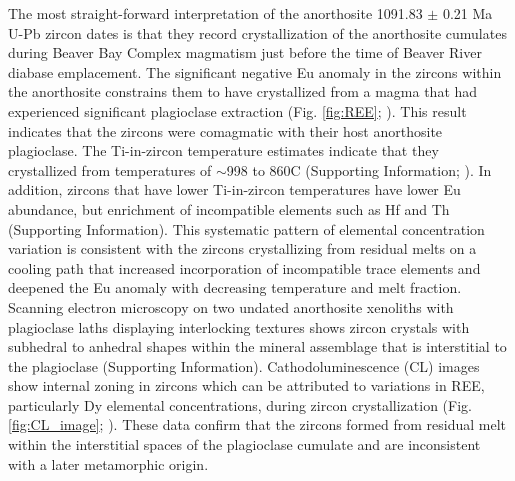 The most straight-forward interpretation of the anorthosite 1091.83 $\pm$ 0.21 Ma U-Pb zircon dates is that they record crystallization of the anorthosite cumulates during Beaver Bay Complex magmatism just before the time of Beaver River diabase emplacement. The significant negative Eu anomaly in the zircons within the anorthosite constrains them to have crystallized from a magma that had experienced significant plagioclase extraction (Fig. \ref{fig:REE}; \cite{Rubatto2002a, Schaltegger1999a}). This result indicates that the zircons were comagmatic with their host anorthosite plagioclase. The Ti-in-zircon temperature estimates indicate that they crystallized from temperatures of $\sim$998 to 860\textdegree C (Supporting Information; \cite{Ferry2007a}). In addition, zircons that have lower Ti-in-zircon temperatures have lower Eu abundance, but enrichment of incompatible elements such as Hf and Th (Supporting Information). This systematic pattern of elemental concentration variation is consistent with the zircons crystallizing from residual melts on a cooling path that increased incorporation of incompatible trace elements and deepened the Eu anomaly with decreasing temperature and melt fraction. Scanning electron microscopy on two undated anorthosite xenoliths with plagioclase laths displaying interlocking textures shows zircon crystals with subhedral to anhedral shapes within the mineral assemblage that is interstitial to the plagioclase (Supporting Information). Cathodoluminescence (CL) images show internal zoning in zircons which can be attributed to variations in REE, particularly Dy elemental concentrations, during zircon crystallization (Fig. \ref{fig:CL_image}; \cite{Remond1992a}). These data confirm that the zircons formed from residual melt within the interstitial spaces of the plagioclase cumulate and are inconsistent with a later metamorphic origin.

